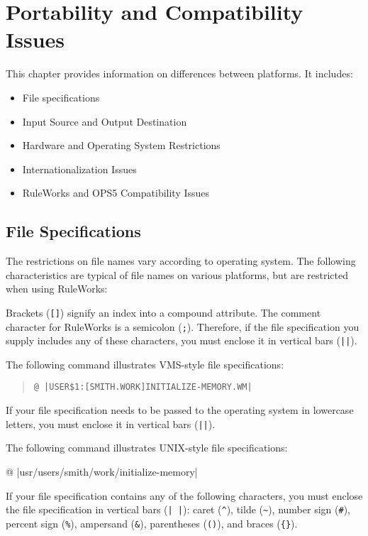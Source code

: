 \chapter{Portability and Compatibility Issues}

This chapter provides information on differences between platforms. It
includes:
\begin{itemize}
\item File specifications
\item Input Source and Output Destination
\item Hardware and Operating System Restrictions
\item Internationalization Issues 
\item RuleWorks and OPS5 Compatibility Issues
\end{itemize}

\section{File Specifications}

The restrictions on file names vary according to operating system. The
following characteristics are typical of file names on various
platforms, but are restricted when using RuleWorks:

Brackets (\verb|[]|) signify an index into a compound attribute. The
comment character for RuleWorks is a semicolon (\verb|;|). Therefore,
if the file specification you supply includes any of these characters,
you must enclose it in vertical bars (\verb,||,).

The following command illustrates VMS-style file specifications:
\begin{quote}
\begin{verbatim}
@ |USER$1:[SMITH.WORK]INITIALIZE-MEMORY.WM|
\end{verbatim}
\end{quote}

If your file specification needs to be passed to the operating system
in lowercase letters, you must enclose it in vertical bars (\verb,||,).

The following command illustrates UNIX-style file specifications:
\begin{qv}
@ |usr/users/smith/work/initialize-memory|
\end{qv}

If your file specification contains any of the following characters,
you must enclose the file specification in vertical bars (\verb,| |,):
caret (\verb|^|), tilde (\verb|~|), number sign (\verb|#|), percent
sign (\verb|%|), ampersand (\verb|&|), parentheses (\verb|()|), and
braces (\verb|{}|).

